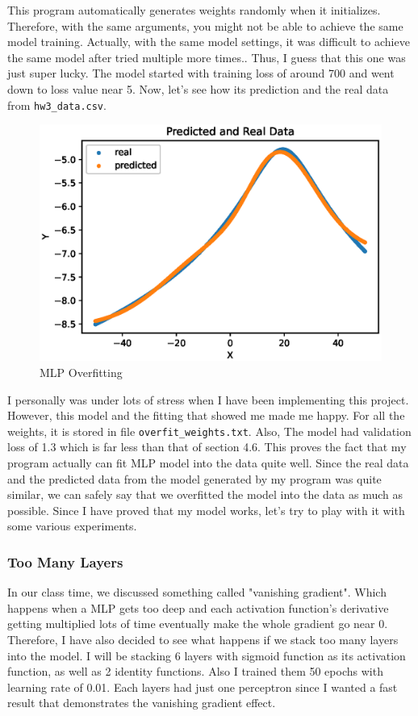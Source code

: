 \documentclass{homework}
\begin{document}
This program automatically generates weights randomly when it initializes. Therefore, with the same arguments, you might not be able to achieve the same model training. Actually, with the same model settings, it was difficult to achieve the same model after tried multiple more times.. Thus, I guess that this one was just super lucky. The model started with training loss of around 700 and went down to loss value near 5. Now, let's see how its prediction and the real data from \texttt{hw3_data.csv}.

\begin{figure}[h]
  \centering
  \includegraphics[scale=0.7]{multilayer_overfitted_new.eps}
  \caption{MLP Overfitting}
\end{figure}
\pagebreak

I personally was under lots of stress when I have been implementing this project. However, this model and the fitting that showed me made me happy. For all the weights, it is stored in file \texttt{overfit_weights.txt}. Also, The model had validation loss of 1.3 which is far less than that of section 4.6. This proves the fact that my program actually can fit MLP model into the data quite well. Since the real data and the predicted data from the model generated by my program was quite similar, we can safely say that we overfitted the model into the data as much as possible. Since I have proved that my model works, let's try to play with it with some various experiments. 

\subsubsection{Too Many Layers}
In our class time, we discussed something called "vanishing gradient". Which happens when a MLP gets too deep and each activation function's derivative getting multiplied lots of time eventually make the whole gradient go near 0. Therefore, I have also decided to see what happens if we stack too many layers into the model. I will be stacking 6 layers with sigmoid function as its activation function, as well as 2 identity functions. Also I trained them 50 epochs with learning rate of 0.01. Each layers had just one perceptron since I wanted a fast result that demonstrates the vanishing gradient effect. 
\end{document}

